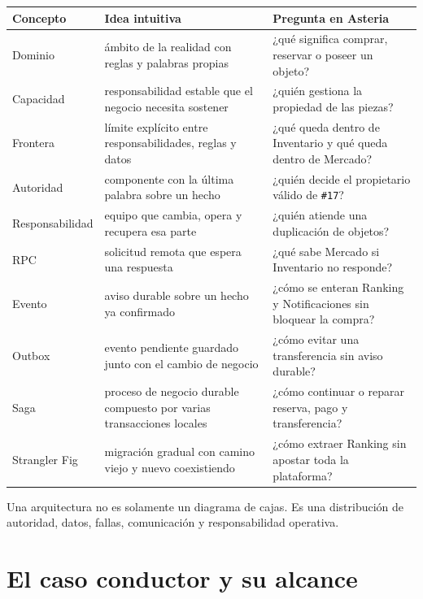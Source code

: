 \documentclass[variant=apuntes,cover=institutional,mode=screen]{ua-engineering-v6-article}
\begin{document}
\begin{center}
\renewcommand{\arraystretch}{1.22}
\begin{tabular}{p{}p{}p{}}
\toprule
\textbf{Concepto} & \textbf{Idea intuitiva} & \textbf{Pregunta en Asteria} \\
\midrule
Dominio & ámbito de la realidad con reglas y palabras propias & ¿qué significa comprar, reservar o poseer un objeto? \\
Capacidad & responsabilidad estable que el negocio necesita sostener & ¿quién gestiona la propiedad de las piezas? \\
Frontera & límite explícito entre responsabilidades, reglas y datos & ¿qué queda dentro de Inventario y qué queda dentro de Mercado? \\
Autoridad & componente con la última palabra sobre un hecho & ¿quién decide el propietario válido de \texttt{\#17}? \\
Responsabilidad & equipo que cambia, opera y recupera esa parte & ¿quién atiende una duplicación de objetos? \\
RPC & solicitud remota que espera una respuesta & ¿qué sabe Mercado si Inventario no responde? \\
Evento & aviso durable sobre un hecho ya confirmado & ¿cómo se enteran Ranking y Notificaciones sin bloquear la compra? \\
Outbox & evento pendiente guardado junto con el cambio de negocio & ¿cómo evitar una transferencia sin aviso durable? \\
Saga & proceso de negocio durable compuesto por varias transacciones locales & ¿cómo continuar o reparar reserva, pago y transferencia? \\
Strangler Fig & migración gradual con camino viejo y nuevo coexistiendo & ¿cómo extraer Ranking sin apostar toda la plataforma? \\
\bottomrule
\end{tabular}
\end{center}

\begin{uainfo}
Una arquitectura no es solamente un diagrama de cajas. Es una distribución de autoridad, datos, fallas, comunicación y responsabilidad operativa.
\end{uainfo}

\section{El caso conductor y su alcance}
\end{document}
